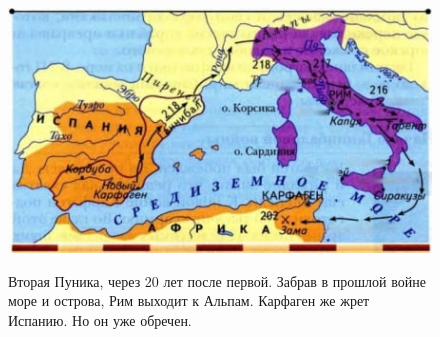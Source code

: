 \begin{figure}[h!tb]
	\centering\includegraphics[scale=0.6]{regional_hehemons/1613656400130734638.png}
	\label{fig:heh7} %
	\caption{Вторая Пуника, через 20 лет после первой. Забрав в прошлой войне море и острова, Рим выходит к Альпам. Карфаген же жрет Испанию. Но он уже обречен. }
\end{figure}


